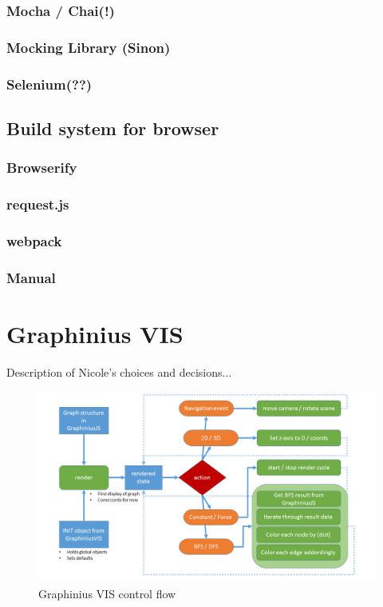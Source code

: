 		\subsubsection{Mocha / Chai(!)}
		\label{sssect:mocha_chai}
		
		\subsubsection{Mocking Library (Sinon)}
		\label{sssect:mocking}

		\subsubsection{Selenium(??)}
		\label{sssect:selenium}

	\subsection{Build system for browser}
		\label{ssect:build_browser}
		
		\subsubsection{Browserify}
		\label{sssect:browserify}
		
		\subsubsection{request.js}
		\label{sssect:request_js}
		
		\subsubsection{webpack}
		\label{sssect:webpack}
		
		\subsubsection{Manual}
		\label{sssect:manual}



\section{Graphinius VIS}
\label{sect:graphinius_vis}

Description of Nicole's choices and decisions...

\begin{landscape}
\begin{figure}[ht]
	\label{fig_vis_control_flow}
	\hspace*{-1cm}
	\includegraphics[width=1.9\textwidth]{figures/VIS_Control_Flow}
	\caption{Graphinius VIS control flow}
\end{figure}
\end{landscape}


